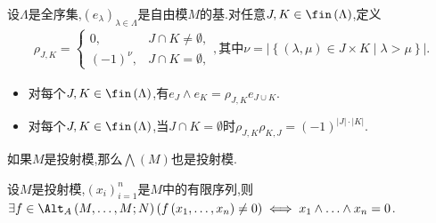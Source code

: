 \begin{remark}{}{}
	设$\Lambda$是全序集,$\left(e_{\lambda}\right)_{\lambda\in\Lambda}$是自由模$M$的基.对任意$J,K\in\fin\left(\Lambda\right)$,定义
	\begin{align*}
		\rho_{J,K}=
		\begin{cases}
			0,&J\cap K\neq\emptyset,\\
			\left(-1\right)^{\nu},&J\cap K=\emptyset,
		\end{cases},\text{其中}\nu=\left|\left\{\left(\lambda,\mu\right)\in J\times K\middle|\lambda>\mu\right\}\right|.
	\end{align*}
	\begin{itemize}
		\item 对每个$J,K\in\fin\left(\Lambda\right)$,有$e_{J}\wedge e_{K}=\rho_{J,K}e_{J\cup K}$.
		\item 对每个$J,K\in\fin\left(\Lambda\right)$,当$J\cap K=\emptyset$时$\rho_{J,K}\rho_{K,J}=\left(-1\right)^{\left|J\right|\cdot\left|K\right|}$.
	\end{itemize}
\end{remark}



\begin{corollary}{}{}
	如果$M$是投射模,那么$\bigwedge\left(M\right)$也是投射模.
\end{corollary}

\begin{corollary}{}{}
	设$M$是投射模,$\left(x_{i}\right)_{i=1}^{n}$是$M$中的有限序列,则$\exists f\in\Alt_{A}\left(M,\ldots,M;N\right)\left(f\left(x_{1},\ldots,x_{n}\right)\neq 0\right)\iff x_{1}\wedge\ldots\wedge x_{n}=0$.
\end{corollary}



























